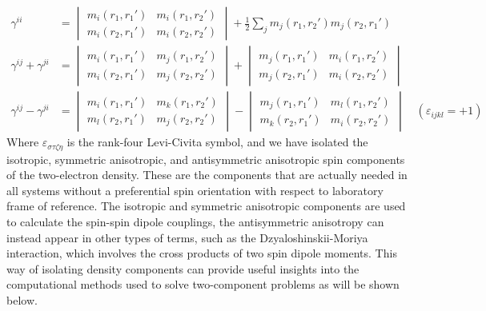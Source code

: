 \documentclass[12pt]{article}
\begin{document}
\begin{align}
 \gamma^{ii} &= \begin{vmatrix} m_i(r_1,r_1') & m_i(r_1,r_2') \\ m_i(r_2,r_1') & m_i(r_2,r_2') \end{vmatrix} 
  + \frac{1}{2} \sum_jm_j(r_1,r_2')m_j(r_2,r_1') \\
 \gamma^{ij}+\gamma^{ji} &= \begin{vmatrix} m_i(r_1,r_1') & m_j(r_1,r_2') \\ m_i(r_2,r_1') & m_j(r_2,r_2') \end{vmatrix} +
                            \begin{vmatrix} m_j(r_1,r_1') & m_i(r_1,r_2') \\ m_j(r_2,r_1') & m_i(r_2,r_2') \end{vmatrix} \\
 \gamma^{ij}-\gamma^{ji} &= \begin{vmatrix} m_i(r_1,r_1') & m_k(r_1,r_2') \\ m_l(r_2,r_1') & m_j(r_2,r_2') \end{vmatrix} -
                            \begin{vmatrix} m_j(r_1,r_1') & m_l(r_1,r_2') \\ m_k(r_2,r_1') & m_i(r_2,r_2') \end{vmatrix} \quad(\varepsilon_{ijkl}=+1)
\end{align}
Where $\varepsilon_{\sigma\tau\zeta\eta}$ is the rank-four Levi-Civita symbol, and we have isolated the isotropic, symmetric anisotropic, and antisymmetric anisotropic spin components of the two-electron density.
These are the components that are actually needed in all systems without a preferential spin orientation with respect to laboratory frame of reference.
The isotropic and symmetric anisotropic components are used to calculate the spin-spin dipole couplings, the antisymmetric anisotropy can instead appear in other types of terms, such as the Dzyaloshinskii-Moriya interaction,\cite{Dzyaloshinsky58_241,Moriya60_91} which involves the cross products of two spin dipole moments.
This way of isolating density components can provide useful insights into the computational methods used to solve two-component problems as will be shown below.
\end{document}
